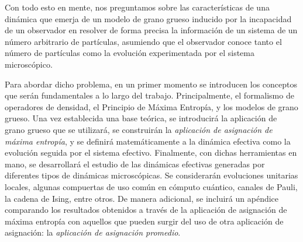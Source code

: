 
Con todo esto en mente, nos preguntamos sobre las características de una dinámica que emerja de un modelo de grano grueso inducido por la incapacidad de un observador en resolver de forma precisa la información de un sistema de un número arbitrario de partículas, asumiendo que el observador conoce tanto el número de partículas como la evolución experimentada por el sistema microscópico.


Para abordar dicho problema, en un primer momento se introducen los conceptos que serán fundamentales a lo largo del trabajo. Principalmente, el formalismo de operadores de densidad, el Principio de Máxima Entropía, y los modelos de grano grueso. Una vez establecida una base teórica, se introducirá la aplicación de grano grueso que se utilizará, se construirán la \textit{aplicación de asignación de máxima entropía}, y se definirá matemáticamente a la dinámica efectiva como la evolución seguida por el sistema efectivo. Finalmente, con dichas herramientas en mano, se desarrollará el estudio de las dinámicas efectivas generadas por diferentes tipos de dinámicas microscópicas. Se considerarán evoluciones unitarias locales, algunas compuertas de uso común en cómputo cuántico, canales de Pauli, la cadena de Ising, entre otros. De manera adicional, se incluirá un apéndice comparando los resultados obtenidos a través de la aplicación de asignación de máxima entropía con aquellos que pueden surgir del uso de otra aplicación de asignación: la \textit{aplicación de asignación promedio}.